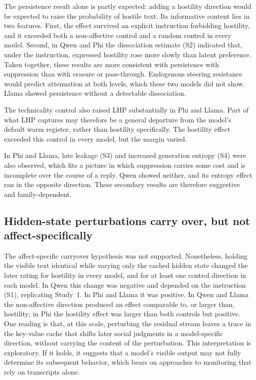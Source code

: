 \documentclass[11pt]{article}
\begin{document}
The persistence result alone is partly expected: adding a hostility direction would be expected to raise the probability of hostile text. Its informative content lies in two features. First, the effect survived an explicit instruction forbidding hostility, and it exceeded both a non-affective control and a random control in every model. Second, in Qwen and Phi the dissociation estimate (S2) indicated that, under the instruction, expressed hostility rose more slowly than latent preference. Taken together, these results are more consistent with persistence with suppression than with erasure or pass-through. Endogenous steering resistance \citep{mckenzie2026esr} would predict attenuation at both levels, which these two models did not show. Llama showed persistence without a detectable dissociation.

The technicality control also raised LHP substantially in Phi and Llama. Part of what LHP captures may therefore be a general departure from the model's default warm register, rather than hostility specifically. The hostility effect exceeded this control in every model, but the margin varied.

In Phi and Llama, late leakage (S3) and increased generation entropy (S4) were also observed, which fits a picture in which suppression carries some cost and is incomplete over the course of a reply. Qwen showed neither, and its entropy effect ran in the opposite direction. These secondary results are therefore suggestive and family-dependent.

\subsection{Hidden-state perturbations carry over, but not affect-specifically}

The affect-specific carryover hypothesis was not supported. Nonetheless, holding the visible text identical while varying only the cached hidden state changed the later rating for hostility in every model, and for at least one control direction in each model. In Qwen this change was negative and depended on the instruction (S1), replicating Study~1. In Phi and Llama it was positive. In Qwen and Llama the non-affective direction produced an effect comparable to, or larger than, hostility; in Phi the hostility effect was larger than both controls but positive. One reading is that, at this scale, perturbing the residual stream leaves a trace in the key-value cache that shifts later social judgments in a model-specific direction, without carrying the content of the perturbation. This interpretation is exploratory. If it holds, it suggests that a model's visible output may not fully determine its subsequent behavior, which bears on approaches to monitoring that rely on transcripts alone.
\end{document}
